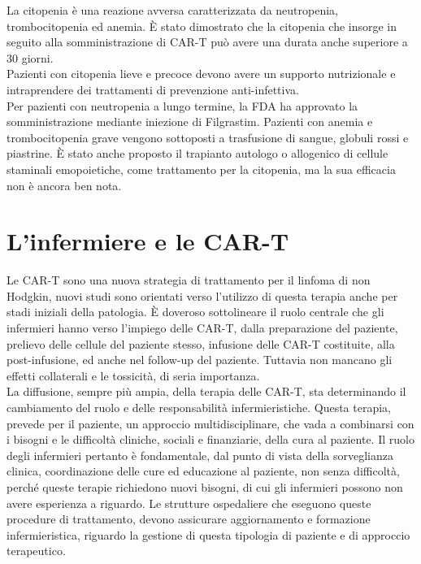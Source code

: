La citopenia è una reazione avversa caratterizzata da neutropenia, trombocitopenia ed anemia. 
È stato dimostrato che la citopenia che insorge in seguito alla somministrazione di CAR-T può avere una durata anche 
superiore a 30 giorni\cite{Frontiers}.\\ 
Pazienti con citopenia lieve e precoce devono avere un supporto nutrizionale e intraprendere dei trattamenti di 
prevenzione anti-infettiva.\\ 
Per pazienti con neutropenia a lungo termine, la FDA ha approvato la somministrazione mediante iniezione di Filgrastim. 
Pazienti con anemia e trombocitopenia grave vengono sottoposti a trasfusione di sangue, globuli rossi e piastrine. 
È stato anche proposto il trapianto autologo o allogenico di cellule staminali emopoietiche, come trattamento per 
la citopenia, ma la sua efficacia non è ancora ben nota\cite{Frontiers}.\\

\section{L’infermiere e le CAR-T}

Le CAR-T sono una nuova strategia di trattamento per il linfoma di non Hodgkin, nuovi studi sono orientati verso 
l’utilizzo di questa terapia anche per stadi iniziali della patologia. È doveroso sottolineare il ruolo centrale 
che gli infermieri hanno verso l’impiego delle CAR-T, dalla preparazione del paziente, prelievo delle cellule del 
paziente stesso, infusione delle CAR-T costituite, alla post-infusione, ed anche nel follow-up del paziente. 
Tuttavia non mancano gli effetti collaterali e le tossicità, di seria importanza\cite{NURSINGCART}.\\
La diffusione, sempre più ampia, della terapia delle CAR-T, sta determinando il cambiamento del ruolo e delle 
responsabilità infermieristiche. Questa terapia, prevede per il paziente, un approccio multidisciplinare, che vada a 
combinarsi con i bisogni e le difficoltà cliniche, sociali e finanziarie, della cura al paziente. Il ruolo degli 
infermieri pertanto è fondamentale, dal punto di vista della sorveglianza clinica, coordinazione delle cure ed 
educazione al paziente, non senza difficoltà, perché queste terapie richiedono nuovi bisogni, di cui gli infermieri 
possono non avere esperienza a riguardo. Le strutture ospedaliere che eseguono queste procedure di trattamento, 
devono assicurare aggiornamento e formazione infermieristica, riguardo la gestione di questa 
tipologia di paziente e di approccio terapeutico\cite{article2}.\\

